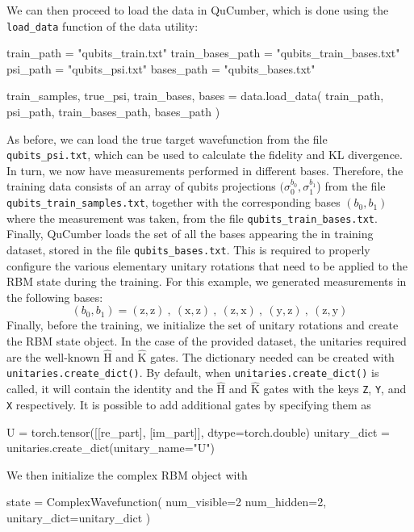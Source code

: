 \documentclass[submission, Phys, hidelinks]{SciPost}
\begin{document}
We can then proceed to load the data in QuCumber, which is done using the \verb|load_data| function of the data utility:
\begin{python}
train_path = "qubits_train.txt"
train_bases_path = "qubits_train_bases.txt"
psi_path = "qubits_psi.txt"
bases_path = "qubits_bases.txt"

train_samples, true_psi, train_bases, bases = data.load_data(
  train_path, psi_path, train_bases_path, bases_path
)
\end{python}
As before, we can load the true target wavefunction from the file \verb|qubits_psi.txt|, which can be used to calculate the fidelity and KL divergence. In turn, we now have measurements performed in different bases. Therefore, the training data consists of an array of qubits projections $(\sigma_0^{b_0},\sigma_1^{b_1}$) from the file \verb|qubits_train_samples.txt|, together with the corresponding bases $(b_0,b_1)$ where the measurement was taken, from the file \verb|qubits_train_bases.txt|. Finally, QuCumber loads the set of all the bases appearing the in training dataset, stored in the file \verb|qubits_bases.txt|. This is required to properly configure the various elementary unitary rotations that need to be applied to the RBM state during the training. For this example, we generated measurements in the following bases:
\begin{equation}
	(b_0,b_1)=(\mathrm{z},\mathrm{z})\:,\:(\mathrm{x},\mathrm{z})\:,\:(\mathrm{z},\mathrm{x})\:,\:(\mathrm{y},\mathrm{z})\:,\:(\mathrm{z},\mathrm{y})
\end{equation}
Finally, before the training, we initialize the set of unitary rotations and create the RBM state object. In the case of the provided dataset, the unitaries required are the well-known $\hat{\mathrm{H}}$ and $\hat{\mathrm{K}}$ gates. The dictionary needed can be created with \verb|unitaries.create_dict()|. 
By default, when \verb|unitaries.create_dict()| is called, it will contain the identity and the $\hat{\mathrm{H}}$ and $\hat{\mathrm{K}}$ gates with the keys \verb|Z|, \verb|Y|, and \verb|X| respectively. It is possible to add additional gates by specifying them as 
\begin{python}
U = torch.tensor([[re_part], [im_part]], dtype=torch.double)
unitary_dict = unitaries.create_dict(unitary_name="U")
\end{python}

We then initialize the complex RBM object with
\begin{python}
state = ComplexWavefunction(
   num_visible=2 num_hidden=2, unitary_dict=unitary_dict
)
\end{python}
\end{document}
